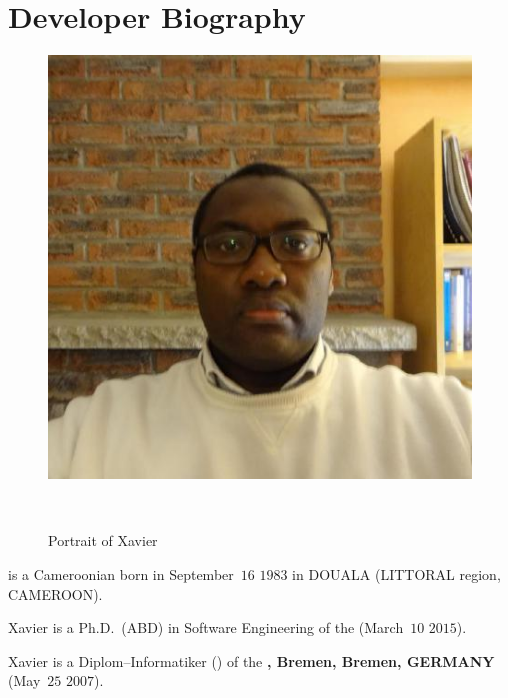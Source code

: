 \section{Developer Biography}\label{chap:biography}
\vspace{-0.9em}
\begin{figure}[!htpb]
\centering
\includegraphics[scale=0.35]{../../francais/images/XavierNOUNDOU-2}
\caption{Portrait of Xavier}~\label{fig:xaviernoumbis}
\end{figure}

\textbf{\myfullacademicname} is a Cameroonian
born in September~$16$ $1983$ in DOUALA (LITTORAL region, CAMEROON).

Xavier is a Ph.D.~(ABD) in Software Engineering
of the  (March~$10$ $2015$).

Xavier is a Diplom--Informatiker (\diplinf) of
the \textbf{\unibremen, Bremen, Bremen, GERMANY} (May~$25$ $2007$).
